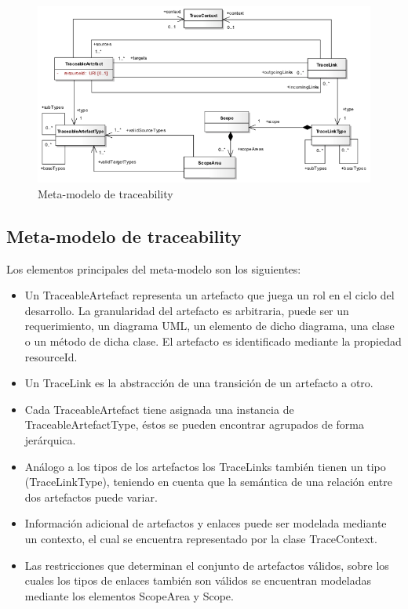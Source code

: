 \documentclass[a4paper,12pt,oneside]{book}
\begin{document}
\begin{figure}[hbtp]
\centering
\includegraphics[scale=.6]{./img/Traceability_Metamodel}
\caption{Meta-modelo de traceability}
\label{fig:SPLMeta-modelo}
\end{figure}

\subsection{Meta-modelo de traceability}

Los elementos principales del meta-modelo son los siguientes:

\begin{itemize}
\item     Un TraceableArtefact representa un artefacto que juega un rol en el ciclo del desarrollo. La granularidad del artefacto es arbitraria, puede ser un requerimiento, un diagrama UML, un elemento de dicho diagrama, una clase o un método de dicha clase. El artefacto es identificado mediante la propiedad resourceId.
\item    Un TraceLink es la abstracción de una transición de un artefacto a otro.
\item    Cada TraceableArtefact tiene asignada una instancia de TraceableArtefactType, éstos se pueden encontrar agrupados de forma jerárquica.
 \item   Análogo a los tipos de los artefactos los TraceLinks también tienen un tipo (TraceLinkType), teniendo en cuenta que la semántica de una relación entre dos artefactos puede variar.
\item    Información adicional de artefactos y enlaces puede ser modelada mediante un contexto, el cual se encuentra representado por la clase TraceContext.
\item    Las restricciones que determinan el conjunto de artefactos válidos, sobre los cuales los tipos de enlaces también son válidos se encuentran modeladas mediante los elementos ScopeArea y Scope.
\end{itemize}
\end{document}
